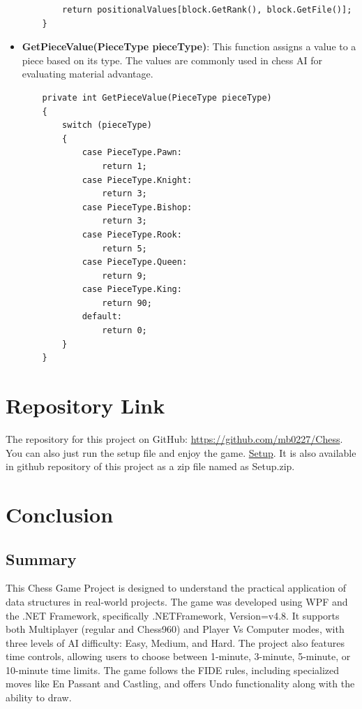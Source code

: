 \documentclass[a4paper,12pt]{article}
\begin{document}
\begin{itemize}
\begin{verbatim}
        return positionalValues[block.GetRank(), block.GetFile()];
    }
    \end{verbatim}

    \item \textbf{GetPieceValue(PieceType pieceType)}: 
    This function assigns a value to a piece based on its type. The values are commonly used in chess AI for evaluating material advantage.

    \begin{verbatim}
    private int GetPieceValue(PieceType pieceType)
    {
        switch (pieceType)
        {
            case PieceType.Pawn:
                return 1;
            case PieceType.Knight:
                return 3;
            case PieceType.Bishop:
                return 3;
            case PieceType.Rook:
                return 5;
            case PieceType.Queen:
                return 9;
            case PieceType.King:
                return 90;
            default:
                return 0;
        }
    }
    \end{verbatim}
\end{itemize}

\section{Repository Link}
The repository for this project on GitHub: 
\href{https://github.com/mb0227/Chess}{https://github.com/mb0227/Chess}.
\newline
You can also just run the setup file and enjoy the game.
\href{https://github.com/mb0227/Chess/releases/tag/Chess}{Setup}.
It is also available in github repository of this project as a zip file named as Setup.zip. 

\section{Conclusion}

\subsection{Summary}
This Chess Game Project is designed to understand the practical application of data structures in real-world projects. The game was developed using WPF and the .NET Framework, specifically .NETFramework, Version=v4.8. It supports both Multiplayer (regular and Chess960) and Player Vs Computer modes, with three levels of AI difficulty: Easy, Medium, and Hard. The project also features time controls, allowing users to choose between 1-minute, 3-minute, 5-minute, or 10-minute time limits. The game follows the FIDE rules, including specialized moves like En Passant and Castling, and offers Undo functionality along with the ability to draw. 
\end{document}
